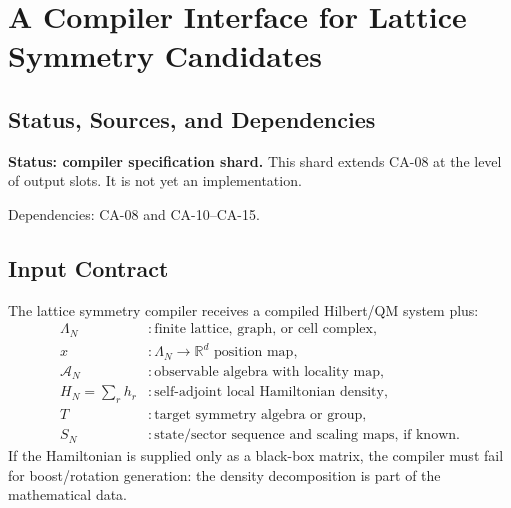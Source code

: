 
\section{A Compiler Interface for Lattice Symmetry Candidates}
\label{sec:lattice-symmetry-compiler-interface}

\subsection{Status, Sources, and Dependencies}

\textbf{Status: compiler specification shard.}  This shard extends CA-08 at the
level of output slots.  It is not yet an implementation.

Dependencies: CA-08 and CA-10--CA-15.


\subsection{Input Contract}

The lattice symmetry compiler receives a compiled Hilbert/QM system plus:
\[
\begin{array}{ll}
\Lambda_N &: \text{finite lattice, graph, or cell complex},\\
x &: \Lambda_N\to\mathbb R^d\text{ position map},\\
\mathcal A_N &: \text{observable algebra with locality map},\\
H_N=\sum_r h_r &: \text{self-adjoint local Hamiltonian density},\\
T &: \text{target symmetry algebra or group},\\
S_N &: \text{state/sector sequence and scaling maps, if known}.
\end{array}
\]
If the Hamiltonian is supplied only as a black-box matrix, the compiler must
fail for boost/rotation generation: the density decomposition is part of the
mathematical data.

